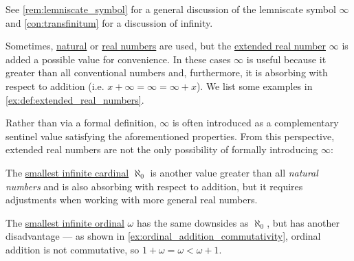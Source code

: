 \begin{comments}
  \item See \cref{rem:lemniscate_symbol} for a general discussion of the lemniscate symbol \( \infty \) and \cref{con:transfinitum} for a discussion of infinity.
\end{comments}

\begin{remark}\label{rem:adjoining_infinity}
  Sometimes, \hyperref[def:natural_numbers]{natural} or \hyperref[def:real_numbers]{real numbers} are used, but the \hyperref[def:extended_real_numbers]{extended real number} \( \infty \) is added a possible value for convenience. In these cases \( \infty \) is useful because it greater than all conventional numbers and, furthermore, it is absorbing with respect to addition (i.e. \( x + \infty = \infty = \infty + x \)). We list some examples in \cref{ex:def:extended_real_numbers}.

  Rather than via a formal definition, \( \infty \) is often introduced as a complementary sentinel value satisfying the aforementioned properties. From this perspective, extended real numbers are not the only possibility of formally introducing \( \infty \):
  \begin{thmenum}
     The \hyperref[def:aleph_hierarchy]{smallest infinite cardinal} \( \aleph_0 \) is another value greater than all \emph{natural numbers} and is also absorbing with respect to addition, but it requires adjustments when working with more general real numbers.

     The \hyperref[thm:omega_is_an_ordinal]{smallest infinite ordinal} \( \omega \) has the same downsides as \( \aleph_0 \), but has another disadvantage --- as shown in \cref{ex:ordinal_addition_commutativity}, ordinal addition is not commutative, so \( 1 + \omega = \omega < \omega + 1 \).
  \end{thmenum}
\end{remark}

